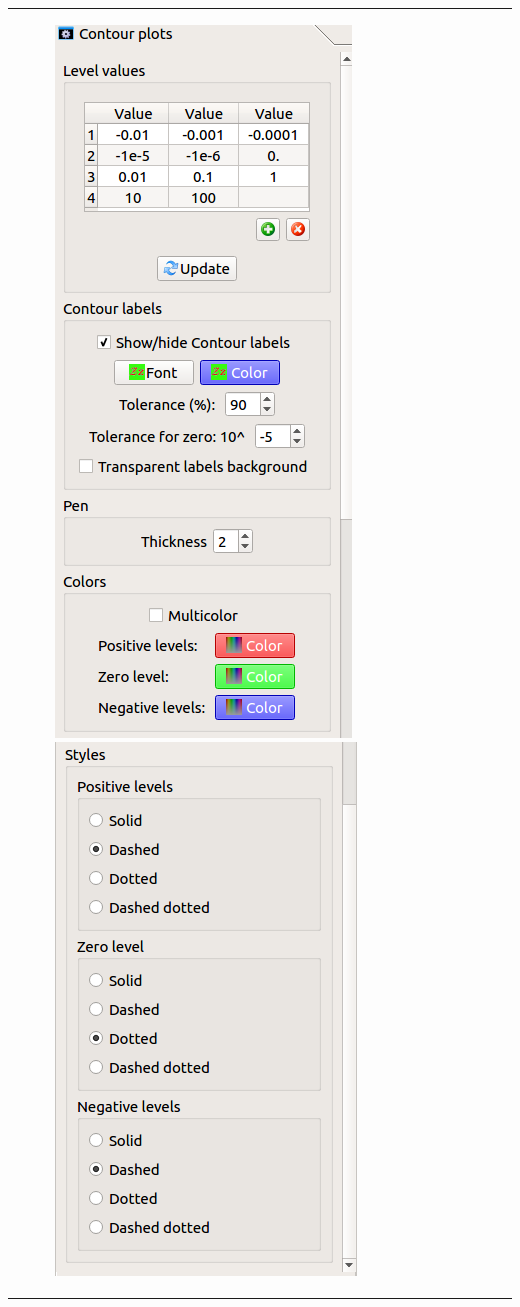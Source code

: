\documentclass[10pt]{article}
\begin{document}
\begin{tabular}{lr}
\hspace*{-3mm}
\begin{minipage}{.5\linewidth}
\hspace*{-3mm}
\vspace*{4mm}
\begin{figure}[H]
\begin{center}
\vspace*{-5mm}
\includegraphics[width=.55\linewidth]{damqt_fig_3_3a.png}
\includegraphics[width=.55\linewidth]{damqt_fig_3_3b.png}

\end{center}
\end{figure}
\end{minipage}
\end{tabular}
\end{document}
